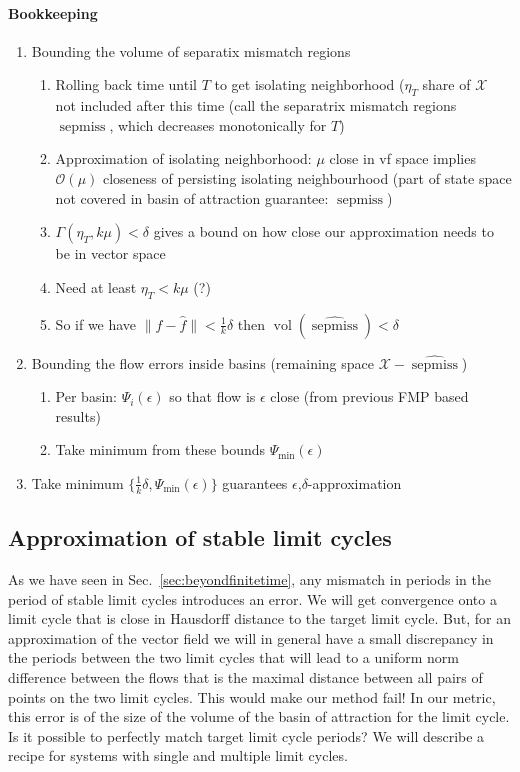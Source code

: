 \documentclass{article}
\theoremstyle{definition} \newtheorem{definition}{Definition}
\theoremstyle{remark} \newtheorem{remark}{Remark}
\newcommand{\vol}{\operatorname{vol}}
\newcounter{ct}
\begin{document}
\paragraph{Bookkeeping}
\begin{enumerate}
\item Bounding the volume of separatix mismatch regions
\begin{enumerate}
\item Rolling back time until $T$ to get isolating neighborhood ($\eta_T$ share of $\mathcal{X}$ not included after this time (call the separatrix mismatch regions $\operatorname{sepmiss}$, which decreases monotonically for $T$)
\item Approximation of isolating neighborhood: $\mu$ close in vf space implies $\mathcal{O}(\mu)$ closeness of persisting isolating neighbourhood (part of state space not covered in basin of attraction guarantee: $\widehat{\operatorname{sepmiss}}$)
\item $\Gamma(\eta_T, k\mu) <  \delta$ gives a bound on how close our approximation needs to be in vector space
\item Need at least $\eta_T<k\mu$ (?)
\item So if we have $\| f - \hat f\|<\tfrac{1}{k}\delta$ then $\vol(\widehat{\operatorname{sepmiss}})<\delta$
\end{enumerate}
\item Bounding the flow errors inside basins (remaining space $\mathcal{X}-\widehat{\operatorname{sepmiss}}$)
\begin{enumerate}
\item Per basin: $\Psi_i(\epsilon)$ so that flow is $\epsilon$ close (from previous FMP based results)
\item Take minimum from these bounds $\Psi_{\min}(\epsilon)$
\end{enumerate}
\item Take minimum $\{\tfrac{1}{k}\delta, \Psi_{\min}(\epsilon)\}$ guarantees $\epsilon$,$\delta$-approximation
\end{enumerate}

\subsection{Approximation of stable limit cycles}\label{sec:lc_theorem}
As we have seen in Sec.~\ref{sec:beyondfinitetime}, any mismatch in periods in the period of stable limit cycles introduces an error.
We will get convergence onto a limit cycle that is close in Hausdorff distance to the target limit cycle. %
But, for an approximation of the vector field we will in general have a small discrepancy in the periods between the two limit cycles that will lead to a uniform norm difference between the flows that is the maximal distance between all pairs of points on the two limit cycles.
This would make our method fail!
In our metric, this error is of the size of the volume of the basin of attraction for the limit cycle.
Is it possible to perfectly match target limit cycle periods?
We will describe a recipe for systems with single and multiple limit cycles.
\end{document}
